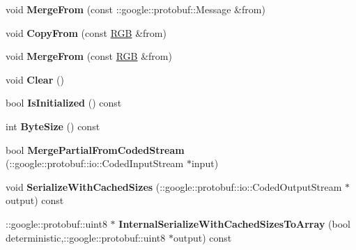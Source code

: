 \begin{DoxyCompactItemize}
\item 
void {\bfseries Merge\+From} (const \+::google\+::protobuf\+::\+Message \&from)\hypertarget{classvss__state_1_1RGB_a6b287c534b5414da22c85a7ace395032}{}\label{classvss__state_1_1RGB_a6b287c534b5414da22c85a7ace395032}

\item 
void {\bfseries Copy\+From} (const \hyperlink{classvss__state_1_1RGB}{R\+GB} \&from)\hypertarget{classvss__state_1_1RGB_af67ab2848e2357d23f411c0df8bce782}{}\label{classvss__state_1_1RGB_af67ab2848e2357d23f411c0df8bce782}

\item 
void {\bfseries Merge\+From} (const \hyperlink{classvss__state_1_1RGB}{R\+GB} \&from)\hypertarget{classvss__state_1_1RGB_a168e56eb490d40877481d8a709ae8322}{}\label{classvss__state_1_1RGB_a168e56eb490d40877481d8a709ae8322}

\item 
void {\bfseries Clear} ()\hypertarget{classvss__state_1_1RGB_ad0c9a1848a43f2d89ebaa33d51ac6634}{}\label{classvss__state_1_1RGB_ad0c9a1848a43f2d89ebaa33d51ac6634}

\item 
bool {\bfseries Is\+Initialized} () const \hypertarget{classvss__state_1_1RGB_a0d2e0b5f89279b7553ef83d702f0bab8}{}\label{classvss__state_1_1RGB_a0d2e0b5f89279b7553ef83d702f0bab8}

\item 
int {\bfseries Byte\+Size} () const \hypertarget{classvss__state_1_1RGB_a2cd250a169ec6f47428b72537d384bcd}{}\label{classvss__state_1_1RGB_a2cd250a169ec6f47428b72537d384bcd}

\item 
bool {\bfseries Merge\+Partial\+From\+Coded\+Stream} (\+::google\+::protobuf\+::io\+::\+Coded\+Input\+Stream $\ast$input)\hypertarget{classvss__state_1_1RGB_a2e6177a7e8c631c1f62a2d986fdfc452}{}\label{classvss__state_1_1RGB_a2e6177a7e8c631c1f62a2d986fdfc452}

\item 
void {\bfseries Serialize\+With\+Cached\+Sizes} (\+::google\+::protobuf\+::io\+::\+Coded\+Output\+Stream $\ast$output) const \hypertarget{classvss__state_1_1RGB_ab16a3fd0ce7788dd974d078e445e7849}{}\label{classvss__state_1_1RGB_ab16a3fd0ce7788dd974d078e445e7849}

\item 
\+::google\+::protobuf\+::uint8 $\ast$ {\bfseries Internal\+Serialize\+With\+Cached\+Sizes\+To\+Array} (bool deterministic,\+::google\+::protobuf\+::uint8 $\ast$output) const \hypertarget{classvss__state_1_1RGB_af94a48e2086eab7b6f8a3787e7277bcf}{}\label{classvss__state_1_1RGB_af94a48e2086eab7b6f8a3787e7277bcf}


\end{DoxyCompactItemize}
